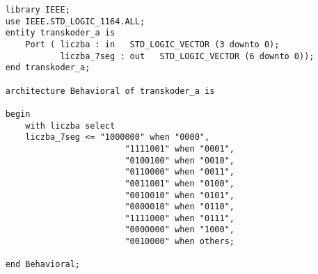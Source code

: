 \begin{lstlisting}
    library IEEE;
    use IEEE.STD_LOGIC_1164.ALL;
    entity transkoder_a is
        Port ( liczba : in   STD_LOGIC_VECTOR (3 downto 0);
               liczba_7seg : out   STD_LOGIC_VECTOR (6 downto 0));
    end transkoder_a;
    
    architecture Behavioral of transkoder_a is
    
    begin
        with liczba select
        liczba_7seg <= "1000000" when "0000", 
                            "1111001" when "0001",
                            "0100100" when "0010",
                            "0110000" when "0011",
                            "0011001" when "0100",
                            "0010010" when "0101",
                            "0000010" when "0110",
                            "1111000" when "0111",
                            "0000000" when "1000",
                            "0010000" when others;
    
    end Behavioral;    
\end{lstlisting}